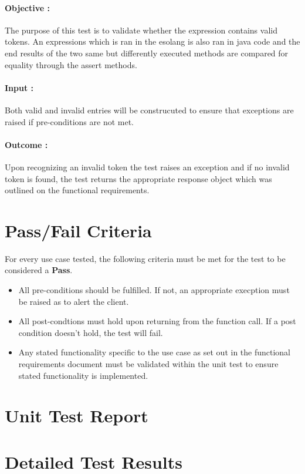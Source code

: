 \documentclass[english]{article}
\begin{document}
			\paragraph{Objective :}The purpose of this test is to validate whether the expression contains valid tokens. An expressions which is ran in the esolang is also ran in java code and the end results of the two same but differently executed methods are compared for equality through the assert methods.
			\paragraph{Input :} Both valid and invalid entries will be construcuted to ensure that exceptions are raised if pre-conditions are not met.
			\paragraph{Outcome :} Upon recognizing an invalid token the test raises an exception and if no invalid token is found, the test returns the  appropriate response object  which was outlined on the functional requirements.  \\
				
		 	
	\newpage
		   \section{Pass/Fail Criteria}
		   For every use case tested, the following criteria must be met for the test to be
		   considered a \textbf{Pass}.
		   \begin{itemize}
		   	\item All pre-conditions should be fulfilled. If not, an appropriate execption
		   	must be raised as to alert the client.
		   	\item All post-condtions must hold upon returning from the function call. If 
		   	a post condition doesn't hold, the test will fail.
		   	\item Any stated functionality specific to the use case as set out in the
		   	functional requirements document must be validated within the unit test to
		   	ensure stated functionality is implemented.
		   \end{itemize}
	
		\newpage
		\section*{Unit Test Report}

		\section{Detailed Test Results}
\end{document}
